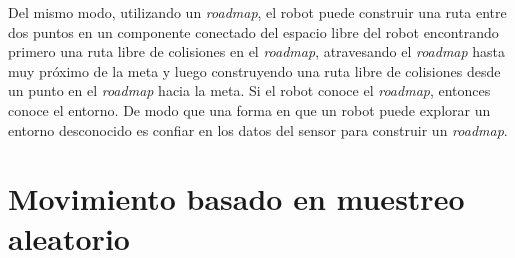 Del mismo modo, utilizando un \textit{roadmap}, el robot puede construir una ruta entre dos puntos en un componente conectado del espacio libre del robot encontrando primero una ruta libre de colisiones en el \textit{roadmap}, atravesando el \textit{roadmap} hasta muy pr\'oximo de la meta y luego construyendo una ruta libre de colisiones desde un punto en el \textit{roadmap} hacia la meta. Si el robot conoce el \textit{roadmap}, entonces conoce el entorno. De modo que una forma en que un robot puede explorar un entorno desconocido es confiar en los datos del sensor para construir un \textit{roadmap}.

\section{Movimiento basado en muestreo aleatorio}




